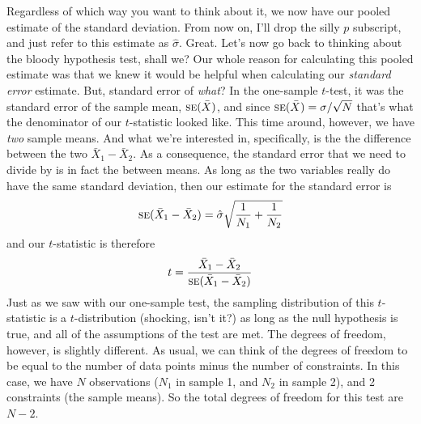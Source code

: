 Regardless of which way you want to think about it, we now have our pooled estimate of the standard deviation. From now on, I'll drop the silly $p$ subscript, and just refer to this estimate as $\hat\sigma$. Great. Let's now go back to thinking about the bloody hypothesis test, shall we? Our whole reason for calculating this pooled estimate was that we knew it would be helpful when calculating our {\it standard error} estimate. But, standard error of {\it what}? In the one-sample $t$-test, it was the standard error of the sample mean, $\SE{\bar{X}}$, and since $\SE{\bar{X}} = \sigma / \sqrt{N}$ that's what the denominator of our $t$-statistic looked like. This time around, however, we have {\it two} sample means. And what we're interested in, specifically, is the the difference between the two $\bar{X}_1 - \bar{X}_2$. As a consequence, the standard error that we need to divide by is in fact the  between means. As long as the two variables really do have the same standard deviation, then our estimate for the standard error is
$$
\SE{\bar{X}_1 - \bar{X}_2} = \hat\sigma \sqrt{\frac{1}{N_1} + \frac{1}{N_2}}
$$
and our $t$-statistic is therefore 
$$
t = \frac{\bar{X}_1 - \bar{X}_2}{\SE{\bar{X}_1 - \bar{X}_2}}
$$
Just as we saw with our one-sample test, the sampling distribution of this $t$-statistic is a $t$-distribution (shocking, isn't it?) as long as the null hypothesis is true, and all of the assumptions of the test are met. The degrees of freedom, however, is slightly different. As usual, we can think of the degrees of freedom to be equal to the number of data points minus the number of constraints. In this case, we have $N$ observations ($N_1$ in sample 1, and $N_2$ in sample 2), and 2 constraints (the sample means). So the total degrees of freedom for this test are $N-2$. 



